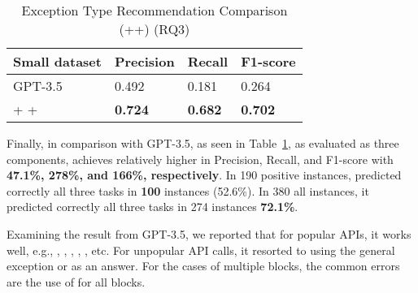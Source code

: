 \begin{table}[t]%
  \caption{Exception Type Recommendation Comparison (\xblock+\xstate+\xtype) (RQ3)}
  \vspace{-12pt}
  \small
	\begin{center}
		\renewcommand{\arraystretch}{1}
		\begin{tabular}{| p{3.10cm}<{\centering} | p{1.2cm}<{\centering} | p{1.2cm}<{\centering}| p{1.2cm}<{\centering}|}
		  \hline
			Small dataset  & Precision  & Recall & F1-score \\
			\hline
                        GPT-3.5 & 0.492 & 0.181 & 0.264 \\
			\hline
			\xblock + \xstate  + \xtype  & \textbf{0.724}  &  \textbf{0.682} & \textbf{0.702}\\
			\hline
		\end{tabular}
		\label{tab:xtype-2}
	\end{center}

\end{table}

Finally, in comparison with GPT-3.5, as seen in
Table~\ref{tab:xtype-2}, {\tool} as evaluated as three components,
achieves relatively higher in Precision, Recall, and F1-score with
{\bf 47.1\%, 278\%, and 166\%, respectively}. In 190 positive
instances, {\tool} predicted correctly all three tasks in {\bf 100}
instances (52.6\%). In 380 all instances, it predicted correctly all
three tasks in 274 instances {\bf 72.1\%}.

Examining the result from GPT-3.5, we reported that for popular APIs,
it works well, e.g., ,
, ,
, , etc. For
unpopular API calls, it resorted to using the general exception
 or  as an answer. For the cases of
multiple  blocks, the common errors are the use of
 for all blocks.

